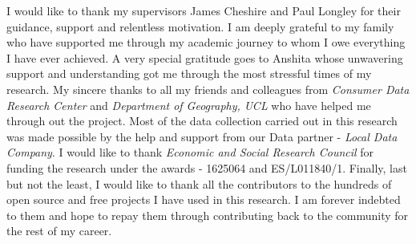 I would like to thank my supervisors James Cheshire and Paul Longley for their guidance, support and relentless motivation.
I am deeply grateful to my family who have supported me through my academic journey to whom I owe everything I have ever achieved.
A very special gratitude goes to Anshita whose unwavering support and understanding got me through the most stressful times of my research.
My sincere thanks to all my friends and colleagues from \textit{Consumer Data Research Center} and \textit{Department of Geography, UCL} who have helped me through out the project.
Most of the data collection carried out in this research was made possible by the help and support from our Data partner - \textit{Local Data Company}.
I would like to thank \textit{Economic and Social Research Council} for funding the research under the awards - 1625064 and ES/L011840/1.
Finally, last but not the least, I would like to thank all the contributors to the hundreds of open source and free projects I have used in this research. I am forever indebted to them and hope to repay them through contributing back to the community for the rest of my career.
